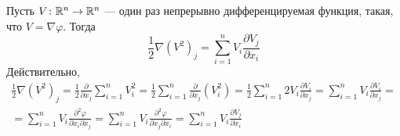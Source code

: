 Пусть $V \colon \mathbb{R}^n \to \mathbb{R}^n$ --- один раз непрерывно дифференцируемая функция, такая, что $V = \nabla \varphi$.
Тогда
\begin{equation} \label{1-2-nabla-V-2}
	\frac{1}{2}\nabla(V^2)_j  = \sum\limits_{i=1}^n V_i \frac{\partial V_j}{\partial x_i}
\end{equation}
Действительно,
\begin{multline*}
	\frac{1}{2} \nabla(V^2)_j  =
	\frac{1}{2} \frac{\partial}{\partial x_j} \sum\limits_{i=1}^{n} V_i^2 =
	\frac{1}{2} \sum\limits_{i=1}^{n} \frac{\partial}{\partial x_j}(V_i^2) =
	\frac{1}{2} \sum\limits_{i=1}^{n} 2 V_i \frac{\partial V_i}{\partial x_j} =
	\sum\limits_{i=1}^{n} V_i \frac{\partial V_i}{\partial x_j} =
	\\ =
	\sum\limits_{i=1}^{n} V_i \frac{\partial^2 \varphi}{\partial x_i \partial x_j} =
	\sum\limits_{i=1}^{n} V_i \frac{\partial^2 \varphi}{\partial x_j \partial x_i} =
	\sum\limits_{i=1}^{n} V_i \frac{\partial V_j}{\partial x_i}
\end{multline*}

